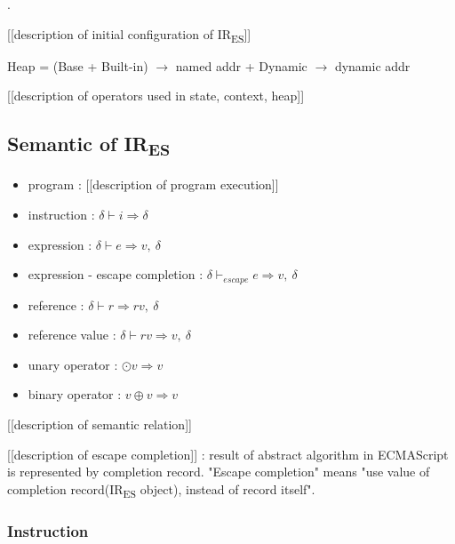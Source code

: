 \documentclass[11pt]{article}
\newcommand{\irname}[0]{IR\textsubscript{ES}\xspace}
\newcommand{\symstate}[0]{\delta}
\newcommand{\symuop}[0]{\odot}
\newcommand{\symbop}[0]{\oplus}
\newcommand{\evaluop}[2]{\symuop #1 \Rightarrow #2}
\newcommand{\evalbop}[3]{#1 \symbop #2 \Rightarrow #3}
\newcommand{\evalinst}[3]{#1 \vdash #2 \Rightarrow #3}
\newcommand{\evalexpr}[4]{#1 \vdash #2 \Rightarrow #3,\ #4}
\newcommand{\evalescexpr}[4]{#1 \vdash_{escape} #2 \Rightarrow #3,\ #4}
\newcommand{\evalref}[4]{#1 \vdash #2 \Rightarrow #3,\ #4}
\newcommand{\evalrefv}[4]{#1 \vdash #2 \Rightarrow #3,\ #4}
\begin{document}
.

[[description of initial configuration of \irname]]

Heap = (Base + Built-in) $\rightarrow$ named addr + Dynamic $\rightarrow$
dynamic addr

[[description of operators used in state, context, heap]]

\newpage

\subsection{Semantic of \irname}

\begin{itemize}
  \item program : [[description of program execution]]
  \item instruction : $\evalinst{\symstate}{i}{\symstate}$
  \item expression : $\evalexpr{\symstate}{e}{v}{\symstate}$
  \item expression - escape completion :
  $\evalescexpr{\symstate}{e}{v}{\symstate}$
  \item reference : $\evalref{\symstate}{r}{rv}{\symstate}$
  \item reference value : $\evalrefv{\symstate}{rv}{v}{\symstate}$
  \item unary operator : $\evaluop{v}{v}$
  \item binary operator : $\evalbop{v}{v}{v}$
\end{itemize}

[[description of semantic relation]] 

[[description of escape completion]] : result of abstract algorithm in ECMAScript
is represented by completion record. "Escape completion" means "use value of 
completion record(\irname object), instead of record itself".

\newpage

\subsubsection{Instruction}
\end{document}
